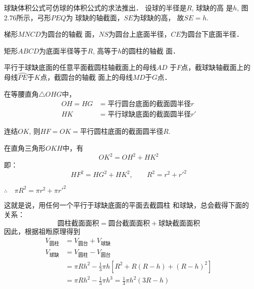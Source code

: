 球缺体积公式可仿球的体积公式的求法推出．
设球的半径是$R$, 球缺的高
是$h$, 图2.76所示，弓形$PEQ$为
球缺的轴截面，$SE$为球缺的高，
故$SE=h$.
\begin{figure}[htp]
    \centering
{}
    \caption{}
\end{figure}

梯形$MNCD$为圆台的轴截
面，$NS$为圆台上底面半径，$CE$为圆台下底面半径．

矩形$ABCD$为底面半径等于$R$, 高等于$h$的圆柱的轴截
面．

平行于球缺底面的任意平面截圆柱轴截面上的母线$AD$
于$F$点，截球缺轴截面上的母线$\wideparen{PE}$于$K$点，截圆台的轴截
面上的母线$MD$于$G$点．

在等腰直角$\triangle OHG$中，
\[\begin{split}
    OH=HG&=\text{平行圆台底面的截面圆半径}r\\
HK&=\text{平行球缺底面的截面圆半径}r'
\end{split}\]

连结$OK$, 则$HF=OK=$平行圆柱底面的截面圆半径$R$. 

在直角三角形$OKH$中，有
\[OK^2=OH^2+HK^2\]
即：
\[HF^2=HG^2+HK^2,\qquad R^2=r^2+{r'}^2\]

$\therefore\quad \pi R^2=\pi r^2+\pi {r'}^2$

这就是说，用任何一个平行于球缺底面的平面去截圆柱
和球缺，总会截得下面的关系：
\[\text{圆柱截面面积}=\text{圆台截面面积}+\text{球缺截面面积}\]
因此，根据祖暅原理得到
\[\begin{split}
 V_{\text{圆柱}}&=V_{\text{圆台}}+V_{\text{球缺}}\\
V_{\text{球缺}}&=V_{\text{圆柱}}-V_{\text{圆台}}\\
& =  \pi Rh^2-\frac{1}{3}\pi h[R^2+R(R-h)+(R-h)^2]\\
&=\pi Rh^2-\frac{1}{3}\pi h^3=\frac{1}{3}\pi h^2(3R-h)
\end{split}\]

